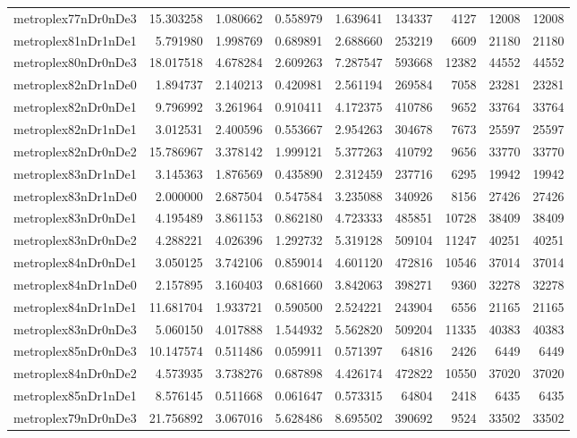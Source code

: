 \documentclass[../../../thesis.tex]{subfiles}
\begin{document}
\begin{longtable}{|l|r|r|r|r|r|r|r|r|}
metroplex77nDr0nDe3 & 15.303258 & 1.080662 & 0.558979 & 1.639641 & 134337 & 4127 & 12008 & 12008 \\
metroplex81nDr1nDe1 & 5.791980 & 1.998769 & 0.689891 & 2.688660 & 253219 & 6609 & 21180 & 21180 \\
metroplex80nDr0nDe3 & 18.017518 & 4.678284 & 2.609263 & 7.287547 & 593668 & 12382 & 44552 & 44552 \\
metroplex82nDr1nDe0 & 1.894737 & 2.140213 & 0.420981 & 2.561194 & 269584 & 7058 & 23281 & 23281 \\
metroplex82nDr0nDe1 & 9.796992 & 3.261964 & 0.910411 & 4.172375 & 410786 & 9652 & 33764 & 33764 \\
metroplex82nDr1nDe1 & 3.012531 & 2.400596 & 0.553667 & 2.954263 & 304678 & 7673 & 25597 & 25597 \\
metroplex82nDr0nDe2 & 15.786967 & 3.378142 & 1.999121 & 5.377263 & 410792 & 9656 & 33770 & 33770 \\
metroplex83nDr1nDe1 & 3.145363 & 1.876569 & 0.435890 & 2.312459 & 237716 & 6295 & 19942 & 19942 \\
metroplex83nDr1nDe0 & 2.000000 & 2.687504 & 0.547584 & 3.235088 & 340926 & 8156 & 27426 & 27426 \\
metroplex83nDr0nDe1 & 4.195489 & 3.861153 & 0.862180 & 4.723333 & 485851 & 10728 & 38409 & 38409 \\
metroplex83nDr0nDe2 & 4.288221 & 4.026396 & 1.292732 & 5.319128 & 509104 & 11247 & 40251 & 40251 \\
metroplex84nDr0nDe1 & 3.050125 & 3.742106 & 0.859014 & 4.601120 & 472816 & 10546 & 37014 & 37014 \\
metroplex84nDr1nDe0 & 2.157895 & 3.160403 & 0.681660 & 3.842063 & 398271 & 9360 & 32278 & 32278 \\
metroplex84nDr1nDe1 & 11.681704 & 1.933721 & 0.590500 & 2.524221 & 243904 & 6556 & 21165 & 21165 \\
metroplex83nDr0nDe3 & 5.060150 & 4.017888 & 1.544932 & 5.562820 & 509204 & 11335 & 40383 & 40383 \\
metroplex85nDr0nDe3 & 10.147574 & 0.511486 & 0.059911 & 0.571397 & 64816 & 2426 & 6449 & 6449 \\
metroplex84nDr0nDe2 & 4.573935 & 3.738276 & 0.687898 & 4.426174 & 472822 & 10550 & 37020 & 37020 \\
metroplex85nDr1nDe1 & 8.576145 & 0.511668 & 0.061647 & 0.573315 & 64804 & 2418 & 6435 & 6435 \\
metroplex79nDr0nDe3 & 21.756892 & 3.067016 & 5.628486 & 8.695502 & 390692 & 9524 & 33502 & 33502 \\

\end{longtable}
\end{document}
